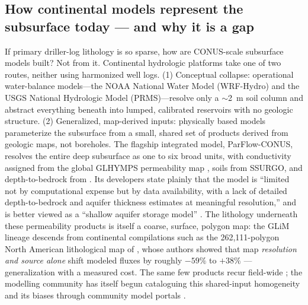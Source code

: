 \documentclass[12pt]{article}
\begin{document}
\subsection{How continental models represent the subsurface today --- and why it is a gap}
If primary driller-log lithology is so sparse, how are CONUS-scale subsurface models built? Not from it.
Continental hydrologic platforms take one of two routes, neither using harmonized well logs.
(1) Conceptual collapse: operational water-balance models---the NOAA National Water Model
(WRF-Hydro) and the USGS National Hydrologic Model (PRMS)---resolve only a $\sim$2~m soil column and
abstract everything beneath into lumped, calibrated reservoirs with no geologic structure.
(2) Generalized, map-derived inputs: physically based models parameterize the subsurface from a
small, shared set of products derived from geologic maps, not boreholes. The flagship integrated
model, ParFlow-CONUS, resolves the entire deep subsurface as one \citep[CONUS1: 5 layers,
102~m;][]{maxwell2015parflow} to six \citep[CONUS2: 10 layers, 392~m;][]{yang2023conus2} broad units, with
conductivity assigned from the global GLHYMPS permeability map \citep[itself derived from the GLiM
lithology map,][]{gleeson2014glhymps,hartmann2012glim}, soils from SSURGO, and depth-to-bedrock from
\citet{shangguan2017}. Its developers state plainly that the model is ``limited not by computational
expense but by data availability, with a lack of detailed depth-to-bedrock and aquifer thickness estimates
at meaningful resolution,'' and is better viewed as a ``shallow aquifer storage model''
\citep{oneill2021conus1}. The lithology underneath these permeability products is itself a coarse, surface,
polygon map: the GLiM lineage descends from continental compilations such as the 262{,}111-polygon North
American lithological map of \citet{moosdorf2010}, whose authors showed that map \emph{resolution and
source alone} shift modeled fluxes by roughly $-59\%$ to $+38\%$ --- generalization with a measured cost.
The same few products recur field-wide \citep{fan2013watertable,degraaf2017,pelletier2016,hengl2017soilgrids};
the modelling community has itself begun cataloguing this shared-input homogeneity and its biases through
community model portals \citep{zamrsky2025gromopo}.
\end{document}
